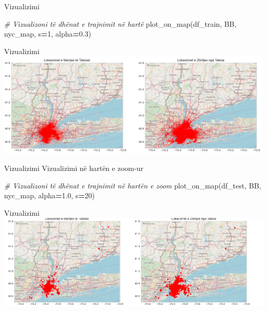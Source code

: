 \documentclass[
  ignorenonframetext,
]{beamer}
\newenvironment{Shaded}{\begin{snugshade}}{\end{snugshade}}
\newcommand{\CommentTok}[1]{\textcolor[rgb]{0.56,0.35,0.01}{\textit{#1}}}
\newcommand{\DecValTok}[1]{\textcolor[rgb]{0.00,0.00,0.81}{#1}}
\newcommand{\FloatTok}[1]{\textcolor[rgb]{0.00,0.00,0.81}{#1}}
\newcommand{\NormalTok}[1]{#1}
\newcommand{\OperatorTok}[1]{\textcolor[rgb]{0.81,0.36,0.00}{\textbf{#1}}}
\begin{document}
\begin{frame}[fragile]{Vizualizimi}
\protect\hypertarget{vizualizimi-1}{}

\begin{Shaded}
\begin{Highlighting}[]
\CommentTok{\# Vizualizoni të dhënat e trajnimit në hartë}
\NormalTok{plot\_on\_map(df\_train, BB, nyc\_map, s}\OperatorTok{=}\DecValTok{1}\NormalTok{, alpha}\OperatorTok{=}\FloatTok{0.3}\NormalTok{)}
\end{Highlighting}
\end{Shaded}
\end{frame}

\begin{frame}{Vizualizimi}
\protect\hypertarget{vizualizimi-2}{}
\includegraphics{./Figs/train11.png}
\end{frame}

\begin{frame}[fragile]{Vizualizimi}
\protect\hypertarget{vizualizimi-3}{}
Vizualizimi në hartën e zoom-ur


\begin{Shaded}
\begin{Highlighting}[]
\CommentTok{\# Vizualizoni të dhënat e trajnimit në hartën e zoom}
\NormalTok{plot\_on\_map(df\_test, BB, nyc\_map, alpha}\OperatorTok{=}\FloatTok{1.0}\NormalTok{, s}\OperatorTok{=}\DecValTok{20}\NormalTok{)}
\end{Highlighting}
\end{Shaded}
\end{frame}

\begin{frame}{Vizualizimi}
\protect\hypertarget{vizualizimi-4}{}
\includegraphics{./Figs/train12.png}
\end{frame}
\end{document}

